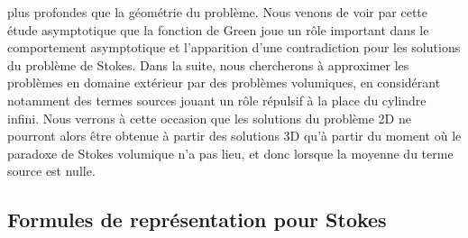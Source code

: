 plus profondes que la géométrie du problème. Nous venons de voir par cette étude asymptotique que la fonction de Green joue un rôle important dans le comportement asymptotique et l'apparition d'une contradiction pour les solutions du problème de Stokes. Dans la suite, nous chercherons à approximer 
les problèmes en domaine extérieur par des problèmes volumiques, en considérant notamment des termes sources jouant un rôle répulsif à la place du cylindre infini. Nous verrons à cette occasion que les solutions du problème 2D ne pourront alors être obtenue à partir des solutions 3D qu'à partir du moment où le paradoxe
de Stokes volumique n'a pas lieu, et donc lorsque la moyenne du terme source est nulle. 


\subsection{Formules de représentation pour Stokes}


